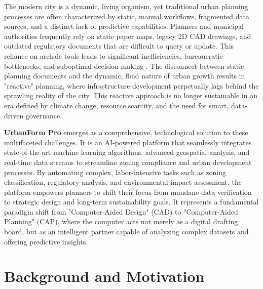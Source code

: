 \documentclass[12pt,a4paper]{report}
\begin{document}
The modern city is a dynamic, living organism, yet traditional urban planning processes are often characterized by static, manual workflows, fragmented data sources, and a distinct lack of predictive capabilities. Planners and municipal authorities frequently rely on static paper maps, legacy 2D CAD drawings, and outdated regulatory documents that are difficult to query or update. This reliance on archaic tools leads to significant inefficiencies, bureaucratic bottlenecks, and suboptimal decision-making \cite{de2013aiml}. The disconnect between static planning documents and the dynamic, fluid nature of urban growth results in "reactive" planning, where infrastructure development perpetually lags behind the sprawling reality of the city. This reactive approach is no longer sustainable in an era defined by climate change, resource scarcity, and the need for smart, data-driven governance.

\textbf{UrbanForm Pro} emerges as a comprehensive, technological solution to these multifaceted challenges. It is an AI-powered platform that seamlessly integrates state-of-the-art machine learning algorithms, advanced geospatial analysis, and real-time data streams to streamline zoning compliance and urban development processes. By automating complex, labor-intensive tasks such as zoning classification, regulatory analysis, and environmental impact assessment, the platform empowers planners to shift their focus from mundane data verification to strategic design and long-term sustainability goals. It represents a fundamental paradigm shift from "Computer-Aided Design" (CAD) to "Computer-Aided Planning" (CAP), where the computer acts not merely as a digital drafting board, but as an intelligent partner capable of analyzing complex datasets and offering predictive insights.

\section{Background and Motivation}
\end{document}
